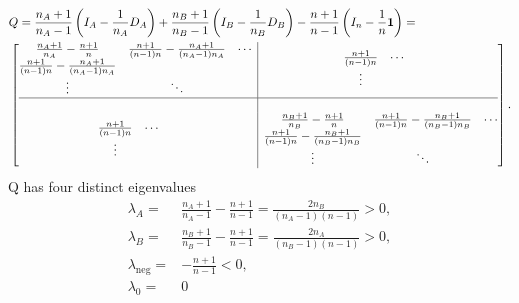 \documentclass{article}
\theoremstyle{definition}
\theoremstyle{remark}
\begin{document}
\begin{align*}
	 & Q = \frac{n_A +1}{n_A -1} \left(I_A - \frac{1}{n_A} D_A\right) +
	\frac{n_B +1}{n_B -1}\left(I_B - \frac{1}{n_B} D_B\right) -
	\frac{n +1}{n -1}\left(I_n - \frac{1}{n} \mathbf{1}\right) =        \\
	 &
	\left[\begin{array}{@{}c|c@{}}
			      \begin{matrix}
				\frac{n_A +1}{n_A} - \frac{n+1}{n}              & \frac{n+1}{(n-1)n} - \frac{n_A +1}{(n_A -1)n_A} & \cdots \\
				\frac{n+1}{(n-1)n} - \frac{n_A +1}{(n_A -1)n_A} &                                                          \\
				\vdots                                          & \ddots                                          &
			\end{matrix}
			                                       & \begin{matrix}
				                                   \frac{n+1}{(n-1)n} & \cdots & \\
				                                   \vdots                        \\
			                                   \end{matrix}                                           \\
			      \hline                                                                                                     \\
			      \begin{matrix}
				\frac{n+1}{(n-1)n} & \cdots & \\
				\vdots                        \\
			\end{matrix} &
			      \begin{matrix}
				\frac{n_B +1}{n_B} - \frac{n+1}{n}              & \frac{n+1}{(n-1)n} - \frac{n_B +1}{(n_B -1)n_B} & \cdots \\
				\frac{n+1}{(n-1)n} - \frac{n_B +1}{(n_B -1)n_B} &                                                          \\
				\vdots                                          & \ddots                                          &
			\end{matrix} \\
		      \end{array}\right].
\end{align*}
Q has four distinct eigenvalues
\begin{align*}
	\lambda_A =            & \frac{n_A +1}{n_A -1} - \frac{n+1}{n-1} = \frac{2 n_B}{(n_A -1)(n-1)} > 0, \\
	\lambda_B =            & \frac{n_B +1}{n_B -1} - \frac{n+1}{n-1} = \frac{2 n_A}{(n_B -1)(n-1)} > 0, \\
	\lambda_{\text{neg}} = & -\frac{n+1}{n-1} < 0,                                                      \\
	\lambda_0 =            & 0
\end{align*}
\end{document}
